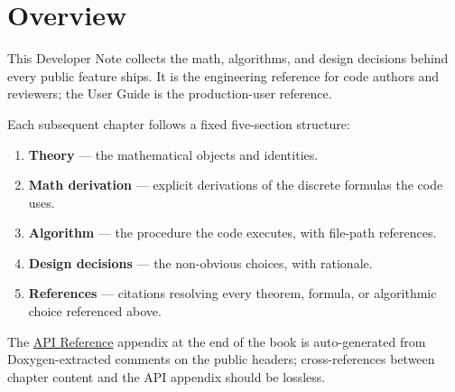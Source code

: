 \chapter{Overview}
\label{chap:dev-overview}

This Developer Note collects the math, algorithms, and design decisions
behind every public feature \gridcalc{} ships. It is the engineering
reference for code authors and reviewers; the User Guide is the
production-user reference.

Each subsequent chapter follows a fixed five-section structure:

\begin{enumerate}
    \item \textbf{Theory} — the mathematical objects and identities.
    \item \textbf{Math derivation} — explicit derivations of the
        discrete formulas the code uses.
    \item \textbf{Algorithm} — the procedure the code executes, with
        file-path references.
    \item \textbf{Design decisions} — the non-obvious choices, with
        rationale.
    \item \textbf{References} — citations resolving every theorem,
        formula, or algorithmic choice referenced above.
\end{enumerate}

The \hyperref[chap:api-reference]{API Reference} appendix at the end of
the book is auto-generated from Doxygen-extracted comments on the
public headers; cross-references between chapter content and the API
appendix should be lossless.
